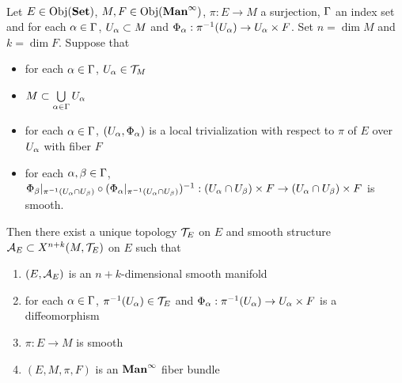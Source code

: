 \documentclass{book}
\begin{document}
	\begin{ex}   \\
		Let $E \in \operatorname{Obj}(\operatorname*{\text{\textbf{Set}}})$, $M, F \in \operatorname{Obj}(\operatorname*{\text{\textbf{Man}}^{\infty}})$, $\pi: E \rightarrow M$ a surjection, $\Gamma$ an index set and for each $\alpha \in \Gamma$, $U_{\alpha} \subset M$ and $\Phi_{\alpha}: \pi^{-1}(U_{\alpha}) \rightarrow U_{\alpha} \times F$. Set $n = \dim M$ and $k = \dim F$. Suppose that 
		\begin{itemize}
			\item for each $\alpha \in \Gamma$, $U_{\alpha} \in \mathcal{T}_M$
			\item $M \subset \bigcup\limits_{\alpha \in \Gamma} U_{\alpha}$ 
			\item for each $\alpha \in \Gamma$, $(U_{\alpha}, \Phi_{\alpha})$ is a local trivialization with respect to $\pi$ of $E$ over $U_{\alpha}$ with fiber $F$ 
			\item for each $\alpha,\beta \in \Gamma$, $\Phi_{\beta}|_{\pi^{-1}(U_{\alpha} \cap U_{\beta})} \circ (\Phi_{\alpha}|_{\pi^{-1}(U_{\alpha} \cap U_{\beta})})^{-1}: (U_{\alpha} \cap U_{\beta}) \times F \rightarrow  (U_{\alpha} \cap U_{\beta}) \times F$ is smooth.
		\end{itemize}
		Then there exist a unique topology $\mathcal{T}_E$ on $E$ and smooth structure $\mathcal{A}_E \subset X^{n+k}(M, \mathcal{T}_E)$ on $E$ such that
		\begin{enumerate}
			\item $(E, \mathcal{A}_E)$ is an $n+k$-dimensional smooth manifold 
			\item for each $\alpha \in \Gamma$, $ \pi^{-1}(U_{\alpha}) \in \mathcal{T}_E$ and $\Phi_{\alpha}: \pi^{-1}(U_{\alpha}) \rightarrow U_{\alpha} \times F$ is a diffeomorphism
			\item $\pi: E \rightarrow M$ is smooth
			\item $(E, M, \pi, F)$ is an $\operatorname*{\text{\textbf{Man}}^{\infty}}$ fiber bundle
		\end{enumerate}
	\end{ex}
\end{document}

